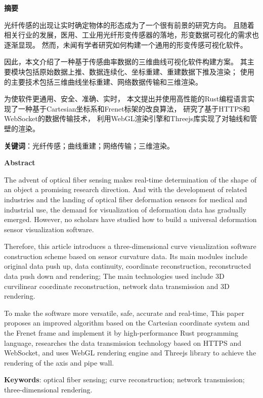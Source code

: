 \clearpage
\begin{center}
    \bfseries {} 摘要
\end{center}

光纤传感的出现让实时确定物体的形态成为了一个很有前景的研究方向。
且随着相关行业的发展，医用、工业用光纤形变传感器的落地，形变数据可视化的需求也逐渐显现。
然而，未闻有学者研究如何构建一个通用的形变传感可视化软件。

因此，本文介绍了一种基于传感曲率数据的三维曲线可视化软件构建方案。
其主要模块包括原始数据上推、数据连续化、坐标重建、重建数据下推及渲染；
使用的主要技术包括三维曲线坐标重建、网络数据传输和三维渲染。

为使软件更通用、安全、准确、实时，
本文提出并使用高性能的Rust编程语言实现了一种基于Cartesian坐标系和Frenet标架的改良算法，
研究了基于HTTPS和WebSocket的数据传输技术，
利用WebGL渲染引擎和Threejs库实现了对轴线和管壁的渲染。

\textbf{关键词}：光纤传感；曲线重建；网络传输；三维渲染。

\clearpage

\begin{center}
    \bfseries {} Abstract
\end{center}

The advent of optical fiber sensing makes real-time determination of the shape of an object a promising research direction.
And with the development of related industries and the landing of optical fiber deformation sensors for medical and industrial use, the demand for visualization of deformation data has gradually emerged.
However, no scholars have studied how to build a universal deformation sensor visualization software.

Therefore, this article introduces a three-dimensional curve visualization software construction scheme based on sensor curvature data.
Its main modules include original data push up, data continuity, coordinate reconstruction, reconstructed data push down and rendering;
The main technologies used include 3D curvilinear coordinate reconstruction, network data transmission and 3D rendering.

To make the software more versatile, safe, accurate and real-time,
This paper proposes an improved algorithm based on the Cartesian coordinate system and the Frenet frame and implement it by high-performance Rust programming language,
researches the data transmission technology based on HTTPS and WebSocket,
and uses WebGL rendering engine and Threejs library to achieve the rendering of the axis and pipe wall.

\textbf{Keywords}: optical fiber sensing; curve reconstruction; network transmission; three-dimensional rendering.